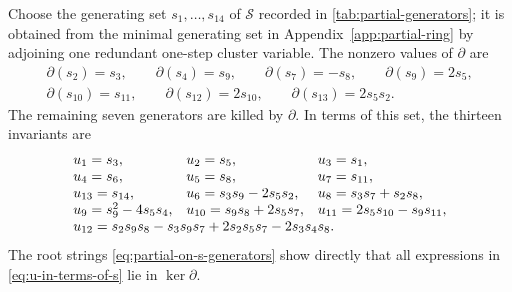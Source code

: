 \documentclass[11pt,reqno]{amsart}
\numberwithin{equation}{section}
\theoremstyle{remark}
\newcommand{\SR}{\mathscr S}
\begin{document}
Choose the generating set $s_1,\ldots,s_{14}$ of $\SR$ recorded in
\cref{tab:partial-generators}; it is obtained from the minimal generating
set in Appendix~\ref{app:partial-ring} by adjoining one redundant one-step
cluster variable.  The nonzero values of $\partial$ are
\begin{equation}
\label{eq:partial-on-s-generators}
 \begin{gathered}
 \partial(s_2)=s_3,\qquad \partial(s_4)=s_9,\qquad
 \partial(s_7)=-s_8,\qquad \partial(s_9)=2s_5,\\
 \partial(s_{10})=s_{11},\qquad
 \partial(s_{12})=2s_{10},\qquad
 \partial(s_{13})=2s_5s_2.
 \end{gathered}
\end{equation}
The remaining seven generators are killed by $\partial$.  In terms of
this set, the thirteen invariants are
\begin{equation}
\label{eq:u-in-terms-of-s}
 \begin{array}{lll}
 u_1=s_3,&u_2=s_5,&u_3=s_1,\\
 u_4=s_6,&u_5=s_8,&u_7=s_{11},\\
 u_{13}=s_{14},&u_6=s_3s_9-2s_5s_2,&u_8=s_3s_7+s_2s_8,\\
 u_9=s_9^2-4s_5s_4,&u_{10}=s_9s_8+2s_5s_7,&u_{11}=2s_5s_{10}-s_9s_{11},\\
 \multicolumn{3}{l}{u_{12}=s_2s_9s_8-s_3s_9s_7+2s_2s_5s_7-2s_3s_4s_8.}
 \end{array}
\end{equation}
The root strings \eqref{eq:partial-on-s-generators} show directly that all
expressions in \eqref{eq:u-in-terms-of-s} lie in $\ker\partial$.
\end{document}
